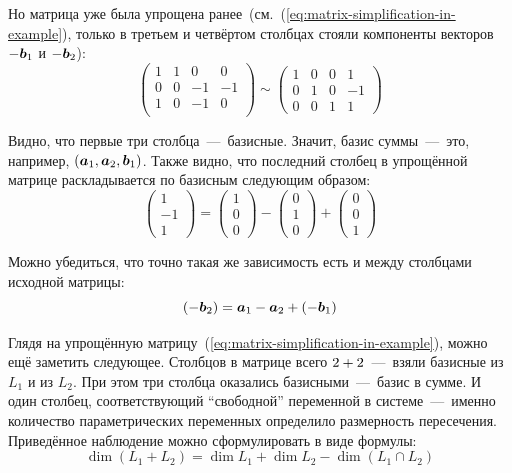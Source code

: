 \documentclass[a4paper,12pt]{article}
\begin{document}
  Но матрица уже была упрощена ранее~(см.~(\ref{eq:matrix-simplification-in-example}), только в третьем и четвёртом столбцах стояли компоненты векторов $-{\boldsymbol b_1}$ и $-{\boldsymbol b_2}$):
  \[
    \begin{pmatrix}
      1 & 1 &  0 &  0\\
      0 & 0 & -1 & -1\\
      1 & 0 & -1 &  0\\
    \end{pmatrix} \sim \begin{pmatrix}
      1 & 0 & 0 & 1\\
      0 & 1 & 0 & -1\\
      0 & 0 & 1 & 1
    \end{pmatrix}
  \]
  
  Видно, что первые три столбца~---~базисные.
  Значит, базис суммы~---~это, например, $(\boldsymbol a_1, \boldsymbol a_2, \boldsymbol b_1)$.
  Также видно, что последний столбец в упрощённой матрице раскладывается по базисным следующим образом:
  \[
    \begin{pmatrix}1 \\ -1 \\ 1\end{pmatrix}
    = \begin{pmatrix}1 \\ 0 \\ 0\end{pmatrix} - \begin{pmatrix}0 \\ 1 \\ 0\end{pmatrix} + \begin{pmatrix}0 \\ 0 \\ 1\end{pmatrix}
  \]
  
  Можно убедиться, что точно такая же зависимость есть и между столбцами исходной матрицы:
  \[
    (-{\boldsymbol b_2}) = \boldsymbol a_1 - \boldsymbol a_2 + (-{\boldsymbol b_1})
  \]
  
  Глядя на упрощённую матрицу~(\ref{eq:matrix-simplification-in-example}), можно ещё заметить следующее.
  Столбцов в матрице всего $2 \hm+ 2$~---~взяли базисные из $L_1$ и из $L_2$.
  При этом три столбца оказались базисными~---~базис в сумме.
  И один столбец, соответствующий ``свободной'' переменной в системе~---~именно количество параметрических переменных определило размерность пересечения.
  Приведённое наблюдение можно сформулировать в виде формулы:
  \[
    \boxed{\dim(L_1 + L_2) = \dim L_1 + \dim L_2 - \dim(L_1 \cap L_2)}
  \]
  
\end{document}
